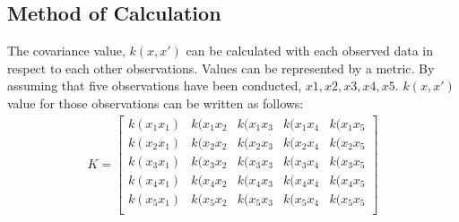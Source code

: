 \subsection{Method of Calculation}
The covariance value, $ k(x,x') $ can be calculated with each observed data in respect to each other observations. Values can be represented by a metric. By assuming that five observations have been conducted, $ x1, x2, x3, x4, x5 $. $k(x,x')$ value for those observations can be written as follows:
\begin{eqnarray}
K = 
\begin{bmatrix} 
k(x_{1}x_{1}) & k(x_{1}x_{2} & k(x_{1}x_{3} & k(x_{1}x_{4} & k(x_{1}x_{5} \\ k(x_{2}x_{1}) & k(x_{2}x_{2} & k(x_{2}x_{3} & k(x_{2}x_{4} & k(x_{2}x_{5} \\
k(x_{3}x_{1}) & k(x_{3}x_{2} & k(x_{3}x_{3} & k(x_{3}x_{4} & k(x_{3}x_{5} \\ k(x_{4}x_{1}) & k(x_{4}x_{2} & k(x_{4}x_{3} & k(x_{4}x_{4} & k(x_{4}x_{5} \\
k(x_{5}x_{1}) & k(x_{5}x_{2} & k(x_{5}x_{3} & k(x_{5}x_{4} & k(x_{5}x_{5} \\ \end{bmatrix}
\label{eq:k-matrix}
\end{eqnarray}

